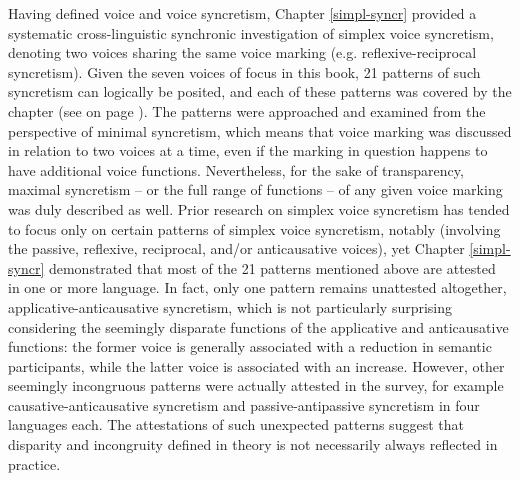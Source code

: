 Having defined voice and voice syncretism, Chapter \ref{simpl-syncr} provided a systematic cross-linguistic synchronic investigation of simplex voice syncretism, denoting two voices sharing the same voice marking (e.g. reflexive-reciprocal syncretism). Given the seven voices of focus in this book, 21 patterns of such syncretism can logically be posited, and each of these patterns was covered by the chapter (see  on page \pageref{tab:ch4:simplex-patterns}). The patterns were approached and examined from the perspective of minimal syncretism, which means that voice marking was discussed in relation to two voices at a time, even if the marking in question happens to have additional voice functions. Nevertheless, for the sake of transparency, maximal syncretism -- or the full range of functions -- of any given voice marking was duly described as well. Prior research on simplex voice syncretism has tended to focus only on certain patterns of simplex voice syncretism, notably  (involving the passive, reflexive, reciprocal, and/or anticausative voices), yet Chapter \ref{simpl-syncr} demonstrated that most of the 21 patterns mentioned above are attested in one or more language. In fact, only one pattern remains unattested altogether, applicative-anticausative syncretism, which is not particularly surprising considering the seemingly disparate functions of the applicative and anticausative functions: the former voice is generally associated with a reduction in semantic participants, while the latter voice is associated with an increase. However, other seemingly incongruous patterns were actually attested in the survey, for example causative-anticausative syncretism and passive-antipassive syncretism in four languages each. The attestations of such unexpected patterns suggest that disparity and incongruity defined in theory is not necessarily always reflected in practice. 

